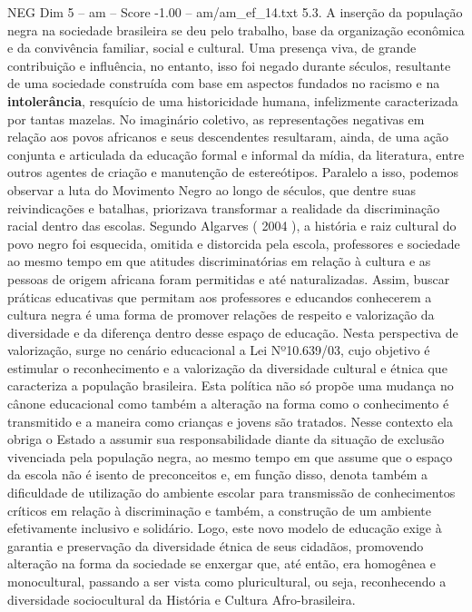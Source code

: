 \begin{textsample}{NEG Dim 5 – am – Score -1.00 – am/am\_ef\_14.txt}  \label{ex:f5_neg_230}
5.3.
A inserção da população negra na sociedade brasileira se deu pelo trabalho, base da organização econômica e da convivência familiar, social e cultural.
Uma presença viva, de grande contribuição e influência, no entanto, isso foi negado durante séculos, resultante de uma sociedade construída com base em aspectos fundados no racismo e na \textbf{intolerância}, resquício de uma historicidade humana, infelizmente caracterizada por tantas mazelas.
No imaginário coletivo, as representações negativas em relação aos povos africanos e seus descendentes resultaram, ainda, de uma ação conjunta e articulada da educação formal e informal da mídia, da literatura, entre outros agentes de criação e manutenção de estereótipos.
Paralelo a isso, podemos observar a luta do Movimento Negro ao longo de séculos, que dentre suas reivindicações e batalhas, priorizava transformar a realidade da discriminação racial dentro das escolas.
Segundo Algarves ( 2004 ), a história e raiz cultural do povo negro foi esquecida, omitida e distorcida pela escola, professores e sociedade ao mesmo tempo em que atitudes discriminatórias em relação à cultura e as pessoas de origem africana foram permitidas e até naturalizadas.
Assim, buscar práticas educativas que permitam aos professores e educandos conhecerem a cultura negra é uma forma de promover relações de respeito e valorização da diversidade e da diferença dentro desse espaço de educação.
Nesta perspectiva de valorização, surge no cenário educacional a Lei Nº10.639/03, cujo objetivo é estimular o reconhecimento e a valorização da diversidade cultural e étnica que caracteriza a população brasileira.
Esta política não só propõe uma mudança no cânone educacional como também a alteração na forma como o conhecimento é transmitido e a maneira como crianças e jovens são tratados.
Nesse contexto ela obriga o Estado a assumir sua responsabilidade diante da situação de exclusão vivenciada pela população negra, ao mesmo tempo em que assume que o espaço da escola não é isento de preconceitos e, em função disso, denota também a dificuldade de utilização do ambiente escolar para transmissão de conhecimentos críticos em relação à discriminação e também, a construção de um ambiente efetivamente inclusivo e solidário.
Logo, este novo modelo de educação exige à garantia e preservação da diversidade étnica de seus cidadãos, promovendo alteração na forma da sociedade se enxergar que, até então, era homogênea e monocultural, passando a ser vista como pluricultural, ou seja, reconhecendo a diversidade sociocultural da História e Cultura Afro-brasileira.

\end{textsample}

